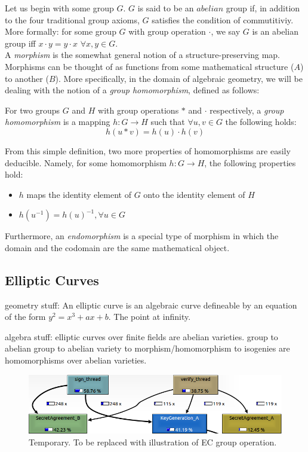 Let us begin with some group $G$. $G$ is said to be an $abelian$ group if, in addition to the four traditional group axioms, $G$ satisfies the condition of commutitiviy. More formally: for some group $G$ with group operation $\cdot$, we say $G$ is an abelian group iff $x \cdot y = y \cdot x$ $\forall x, y \in G$.\\

A \emph{morphism} is the somewhat general notion of a structure-preserving map. Morphisms can be thought of as functions from some mathematical structure ($A$) to another ($B$). More specifically, in the domain of algebraic geometry, we will be dealing with the notion of a \emph{group homomorphism}, defined as follows:
\begin{definition}
\label{defn:homomorphism}
For two groups $G$ and $H$ with group operations $*$ and $\cdot$ respectively, a \emph{group homomorphism} is a mapping $h: G \rightarrow H$ such that $\forall u, v \in G$ the following holds:
$$h(u * v) = h(u) \cdot h(v)$$
\end{definition}
From this simple definition, two more properties of homomorphisms are easily deducible. Namely, for some homomorphism $h: G \rightarrow H$, the following properties hold:
\begin{itemize}
\item $h$ maps the identity element of $G$ onto the identity element of $H$
\item $h(u^{-1}) = h(u)^{-1}, \forall u \in G$
\end{itemize}
Furthermore, an \emph{endomorphism} is a special type of morphism in which the domain and the codomain are the same mathematical object.

\subsection{Elliptic Curves}

geometry stuff:
An elliptic curve is an algebraic curve defineable by an equation of the form $y^2 = x^3 + ax + b$.
The point at infinity.

algebra stuff:
elliptic curves over finite fields are abelian varieties. 
group to abelian group to abelian variety to morphism/homomorphism to isogenies are homomorphisms over abelian varieties.

\begin{figure}[htb]
\centering
\includegraphics[scale=0.3]{signandverifycall.png} %
\caption{Temporary. To be replaced with illustration of EC group operation.}
\label{fig:label} %
\end{figure}

